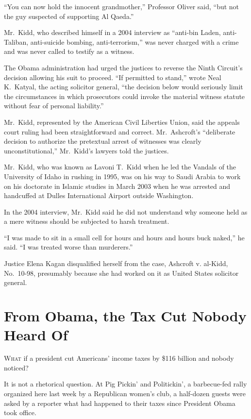 ﻿\documentclass[12pt]{article}
\begin{document}
``You can now hold the innocent grandmother,'' Professor Oliver said, ``but not the guy suspected of
supporting Al Qaeda.''

Mr.~Kidd, who described himself in a 2004 interview as ``anti-bin Laden, anti-Taliban, anti-suicide
bombing, anti-terrorism,'' was never charged with a crime and was never called to testify as a
witness.

The Obama administration had urged the justices to reverse the Ninth Circuit's decision allowing his
suit to proceed. ``If permitted to stand,'' wrote Neal K.~Katyal, the acting solicitor general,
``the decision below would seriously limit the circumstances in which prosecutors could invoke the
material witness statute without fear of personal liability.''

Mr.~Kidd, represented by the American Civil Liberties Union, said the appeals court ruling had been
straightforward and correct. Mr.~Ashcroft's ``deliberate decision to authorize the pretextual arrest
of witnesses was clearly unconstitutional,'' Mr.~Kidd's lawyers told the justices.

Mr.~Kidd, who was known as Lavoni T.~Kidd when he led the Vandals of the University of Idaho in
rushing in 1995, was on his way to Saudi Arabia to work on his doctorate in Islamic studies in March
2003 when he was arrested and handcuffed at Dulles International Airport outside Washington.

In the 2004 interview, Mr.~Kidd said he did not understand why someone held as a mere witness should
be subjected to harsh treatment.

``I was made to sit in a small cell for hours and hours and hours buck naked,'' he said. ``I was
treated worse than murderers.''

Justice Elena Kagan disqualified herself from the case, Ashcroft v. al-Kidd, No.~10-98, presumably
because she had worked on it as United States solicitor general.

\section{From Obama, the Tax Cut Nobody Heard Of}

\lettrine{W}{hat} if a president cut Americans' income taxes by \$116
billion and nobody noticed?

It is not a rhetorical question. At Pig Pickin' and Politickin', a barbecue-fed rally organized here
last week by a Republican women's club, a half-dozen guests were asked by a reporter what had
happened to their taxes since President Obama took office.
\end{document}
